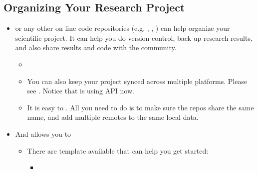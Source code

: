 \documentclass[letterpaper,10pt,english]{sphinxmanual}
\begin{document}
\subsection{Organizing Your Research Project}
\label{\detokenize{resource/research/getting_started:organizing-your-research-project}}\begin{itemize}
\item {} 
 or any other on line code
repositories (e.g. ,
,
) can help organize your
scientific project. It can help you do version control, back up
research results, and also share results and code with the community.
\begin{itemize}
\item {} 

\item {} 
You can also keep your project synced across multiple platforms.
Please see .
Notice that  is using  API now.

\item {} 
It is easy to .
All you need to do is to make sure the repos share the same name,
and add multiple remotes to the same local data.

\end{itemize}

\item {} 
And  allows you to 
\begin{itemize}
\item {} 
There are template available that can help you get started:
\begin{itemize}
\item {} 

\end{itemize}


\end{itemize}
\end{itemize}
\end{document}
